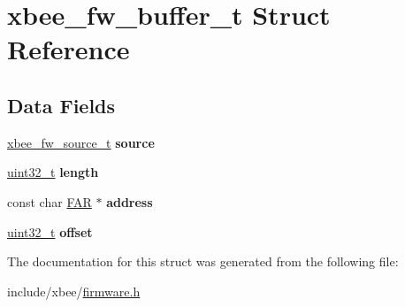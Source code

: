 \hypertarget{structxbee__fw__buffer__t}{\section{xbee\-\_\-fw\-\_\-buffer\-\_\-t Struct Reference}
\label{structxbee__fw__buffer__t}
}
\subsection*{Data Fields}
\begin{DoxyCompactItemize}
\item 
\hypertarget{group__xbee__firmware_ga6de9d84924d5c74f1b9021b1637ecf50}{\hyperlink{structxbee__fw__source__t}{xbee\-\_\-fw\-\_\-source\-\_\-t} {\bfseries source}}\label{group__xbee__firmware_ga6de9d84924d5c74f1b9021b1637ecf50}

\item 
\hypertarget{group__xbee__firmware_gaebb70c2aab3407a9f05334c47131a43b}{\hyperlink{group__hal__dos_ga09a1e304d66d35dd47daffee9731edaa}{uint32\-\_\-t} {\bfseries length}}\label{group__xbee__firmware_gaebb70c2aab3407a9f05334c47131a43b}

\item 
\hypertarget{group__xbee__firmware_gad13231c128c8fc0014133ee29ccdf9f8}{const char \hyperlink{group__hal_gaef060b3456fdcc093a7210a762d5f2ed}{F\-A\-R} $\ast$ {\bfseries address}}\label{group__xbee__firmware_gad13231c128c8fc0014133ee29ccdf9f8}

\item 
\hypertarget{group__xbee__firmware_ga894bdfa2d603d8343f8ef01dda6fcd23}{\hyperlink{group__hal__dos_ga09a1e304d66d35dd47daffee9731edaa}{uint32\-\_\-t} {\bfseries offset}}\label{group__xbee__firmware_ga894bdfa2d603d8343f8ef01dda6fcd23}

\end{DoxyCompactItemize}


The documentation for this struct was generated from the following file\-:\begin{DoxyCompactItemize}
\item 
include/xbee/\hyperlink{firmware_8h}{firmware.\-h}\end{DoxyCompactItemize}
